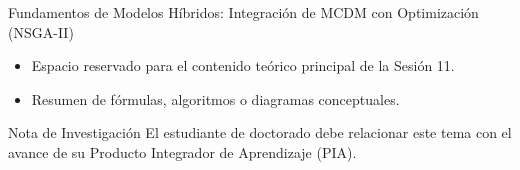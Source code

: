 \documentclass[aspectratio=169, 10pt]{beamer}
\begin{document}
\begin{frame}{Fundamentos de Modelos Híbridos: Integración de MCDM con Optimización (NSGA-II)}
    \begin{itemize}
        \item Espacio reservado para el contenido teórico principal de la Sesión 11.
        \item Resumen de fórmulas, algoritmos o diagramas conceptuales.
    \end{itemize}
    \begin{block}{Nota de Investigación}
        El estudiante de doctorado debe relacionar este tema con el avance de su Producto Integrador de Aprendizaje (PIA).
    \end{block}
\end{frame}
\end{document}
